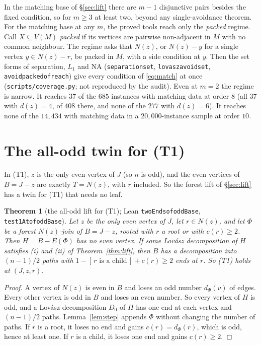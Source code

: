 \documentclass[11pt]{amsart}
\newtheorem{theorem}{Theorem}[section]
\theoremstyle{definition}
\theoremstyle{remark}
\renewcommand{\_}{\oldunderscore\allowbreak}
\newcommand{\ind}[1]{[\,#1\,]}
\begin{document}
In the matching base of \S\ref{sec:lift} there are $m-1$ disjunctive pairs besides the fixed
condition, so for $m\ge3$ at least two, beyond any single-avoidance theorem. For the matching base
at any $m$, the proved tools reach only the \emph{packed} regime. Call $X\subseteq V(M)$
\emph{packed} if its vertices are pairwise non-adjacent in $M$ with no common neighbour. The regime
asks that $N(z)$, or $N(z)-y$ for a single vertex $y\in N(z)-r$, be packed in $M$, with a side
condition at $y$. Then the set forms of separation, $L_1$ and NA (\texttt{separation\_set},
\texttt{lovasz\_avoid\_set}, \texttt{avoid\_packed\_of\_reach}) give every condition of
\eqref{eq:match} at once (\texttt{scripts/coverage.py}; not reproduced by the audit). Even at
$m=2$ the regime is narrow. It reaches $37$ of the $685$ instances with matching data at order $8$
(all $37$ with $d(z)=4$, of $408$ there, and none of the $277$ with $d(z)=6$). It reaches none of
the $14{,}434$ with matching data in a $20{,}000$-instance sample at order $10$.

\section{The all-odd twin for (T1)}\label{sec:allodd}

In (T1), $z$ is the only even vertex of $J$ (so $n$ is odd), and the even vertices of $B=J-z$ are
exactly $T=N(z)$, with $r$ included. So the forest lift of \S\ref{sec:lift} has a twin for (T1) that
needs no leaf.

\begin{theorem}[the all-odd lift for (T1); Lean \texttt{twoEnds\_of\_oddBase}, \texttt{test1At\_of\_oddBase}]\label{thm:oddlift}
Let $z$ be the only even vertex of $J$, let $r\in N(z)$, and let $\Phi$ be a forest $N(z)$-join of
$B=J-z$, rooted with $r$ a root or with $c(r)\ge2$. Then $H=B-E(\Phi)$ has no even vertex. If some
Lov\'asz decomposition of $H$ satisfies (i) and (ii) of Theorem~\ref{thm:lift}, then $B$ has a
decomposition into $(n-1)/2$ paths with $1-\ind{r\text{ is a child}}+c(r)\ge2$ ends at $r$. So (T1)
holds at $(J,z,r)$.
\end{theorem}

\begin{proof}
A vertex of $N(z)$ is even in $B$ and loses an odd number $d_\Phi(v)$ of edges. Every other vertex
is odd in $B$ and loses an even number. So every vertex of $H$ is odd, and a Lov\'asz decomposition
$D_0$ of $H$ has one end at each vertex and $(n-1)/2$ paths. Lemma~\ref{lem:step} appends $\Phi$
without changing the number of paths. If $r$ is a root, it loses no end and gains
$c(r)=d_\Phi(r)$, which is odd, hence at least one. If $r$ is a child, it loses one end and gains
$c(r)\ge2$.
\end{proof}
\end{document}
